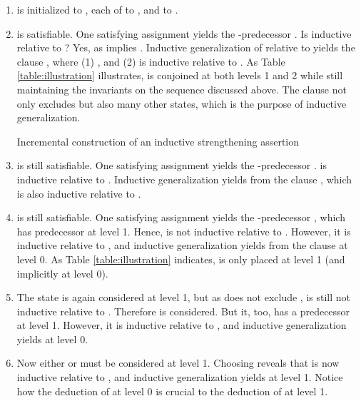 \documentclass{llncs}
\begin{document}
\begin{enumerate}
\item  is initialized to , each of  to , and  to .

\item  is satisfiable.  One satisfying
  assignment yields the -predecessor .  Is  inductive relative to ?  Yes, as
   implies .  Inductive
  generalization of  relative to  yields the clause , where (1) , and (2)  is
  inductive relative to .  As Table \ref{table:illustration}
  illustrates,  is conjoined at both levels 1 and 2 while still
  maintaining the invariants on the sequence 
  discussed above.  The clause  not only excludes  but also
  many other states, which is the purpose of inductive generalization.

\begin{table}[tb]
\caption{Incremental construction of an inductive strengthening assertion}
\label{table:illustration}
\centering
\vspace{-1ex}

\vspace{1em}
\end{table}

\item  is still satisfiable.  One
  satisfying assignment yields the -predecessor .   is inductive relative to .
  Inductive generalization yields from  the clause , which is also inductive relative to .

\item  is still satisfiable.  One
  satisfying assignment yields the -predecessor ,
  which has predecessor  at level 1.  Hence,
   is not inductive relative to .  However, it is
  inductive relative to , and inductive generalization yields
  from  the clause  at level 0.  As
  Table \ref{table:illustration} indicates,  is only placed at
  level 1 (and implicitly at level 0).

\item The state  is again considered at level 1, but as 
  does not exclude ,  is still not inductive relative
  to .  Therefore  is considered.  But it, too, has a
  predecessor  at level 1.  However, it is inductive relative to ,
  and inductive generalization yields  at level 0.

\item Now either  or  must be considered at level 1.
  Choosing  reveals that  is now inductive relative to
  , and inductive generalization yields  at level 1.  Notice how the deduction of  at level 0
  is crucial to the deduction of  at level 1.


\end{enumerate}
\end{document}
